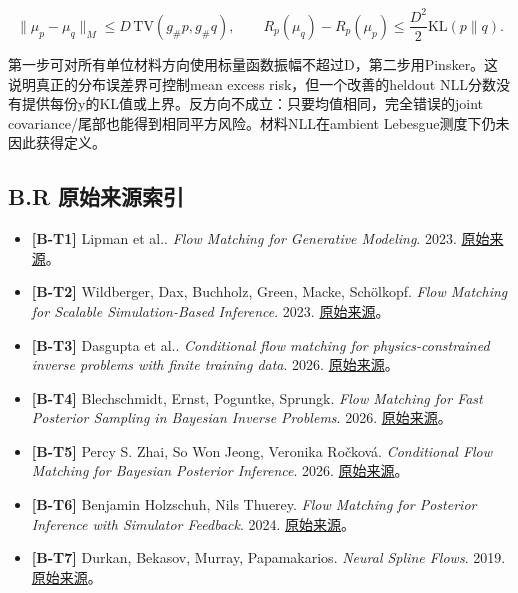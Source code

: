 \documentclass[
  11pt,
  a4paper,
]{article}
\providecommand{\tightlist}{%
  \setlength{\itemsep}{0pt}\setlength{\parskip}{0pt}}
\begin{document}
\[
\|\mu_p-\mu_q\|_M\le D\,\mathrm{TV}(g_\#p,g_\#q),\qquad
R_p(\mu_q)-R_p(\mu_p)\le\frac{D^2}{2}\mathrm{KL}(p\|q).
\]

第一步可对所有单位材料方向使用标量函数振幅不超过D，第二步用Pinsker。这说明真正的分布误差界可控制mean
excess risk，但一个改善的heldout
NLL分数没有提供每份y的KL值或上界。反方向不成立：只要均值相同，完全错误的joint
covariance/尾部也能得到相同平方风险。材料NLL在ambient
Lebesgue测度下仍未因此获得定义。

\hypertarget{b.r-ux539fux59cbux6765ux6e90ux7d22ux5f15}{%
\subsection{B.R
原始来源索引}\label{b.r-ux539fux59cbux6765ux6e90ux7d22ux5f15}}

\begin{itemize}
\tightlist
\item
  \textbf{{[}B-T1{]}} Lipman et al.. \emph{Flow Matching for Generative
  Modeling}. 2023. \href{https://arxiv.org/abs/2210.02747}{原始来源}。
\item
  \textbf{{[}B-T2{]}} Wildberger, Dax, Buchholz, Green, Macke,
  Schölkopf. \emph{Flow Matching for Scalable Simulation-Based
  Inference}. 2023.
  \href{https://papers.neurips.cc/paper_files/paper/2023/hash/3663ae53ec078860bb0b9c6606e092a0-Abstract-Conference.html}{原始来源}。
\item
  \textbf{{[}B-T3{]}} Dasgupta et al.. \emph{Conditional flow matching
  for physics-constrained inverse problems with finite training data}.
  2026. \href{https://arxiv.org/abs/2603.14135}{原始来源}。
\item
  \textbf{{[}B-T4{]}} Blechschmidt, Ernst, Poguntke, Sprungk. \emph{Flow
  Matching for Fast Posterior Sampling in Bayesian Inverse Problems}.
  2026. \href{https://arxiv.org/abs/2610.02377}{原始来源}。
\item
  \textbf{{[}B-T5{]}} Percy S. Zhai, So Won Jeong, Veronika Ro{č}ková.
  \emph{Conditional Flow Matching for Bayesian Posterior Inference}.
  2026. \href{https://arxiv.org/abs/2510.09534}{原始来源}。
\item
  \textbf{{[}B-T6{]}} Benjamin Holzschuh, Nils Thuerey. \emph{Flow
  Matching for Posterior Inference with Simulator Feedback}. 2024.
  \href{https://arxiv.org/abs/2410.22573}{原始来源}。
\item
  \textbf{{[}B-T7{]}} Durkan, Bekasov, Murray, Papamakarios.
  \emph{Neural Spline Flows}. 2019.
  \href{https://papers.neurips.cc/paper_files/paper/2019/hash/7ac71d433f282034e088473244df8c02-Abstract.html}{原始来源}。

\end{itemize}
\end{document}
